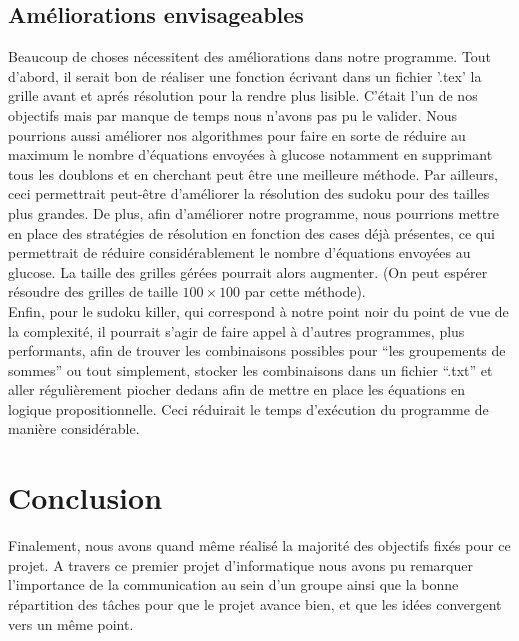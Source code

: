\documentclass[a4paper,8pt,french,fleqn]{article}
\begin{document}
\subsection{Améliorations envisageables}

Beaucoup de choses nécessitent des améliorations dans notre programme. Tout d'abord, il serait bon de réaliser une fonction écrivant dans un fichier '.tex' la grille avant et aprés résolution pour la rendre plus lisible. C'était l'un de nos objectifs mais par manque de temps nous n'avons pas pu le valider. Nous pourrions aussi améliorer nos algorithmes pour faire en sorte de réduire au maximum le nombre d'équations envoyées à glucose notamment en supprimant tous les doublons et en cherchant peut être une meilleure méthode. Par ailleurs, ceci permettrait peut-être d'améliorer la résolution des sudoku pour des tailles plus grandes. De plus, afin d'améliorer notre programme, nous pourrions mettre en place des stratégies de résolution en fonction des cases déjà présentes, ce qui permettrait de réduire considérablement le nombre d'équations envoyées au glucose. La taille des grilles gérées pourrait alors augmenter. (On peut espérer résoudre des grilles de taille $100 \times 100$ par cette méthode). \\

Enfin, pour le sudoku killer, qui correspond à notre point noir du point de vue de la complexité, il pourrait s'agir de faire appel à d'autres programmes, plus performants, afin de trouver les combinaisons possibles pour ``les groupements de sommes'' ou tout simplement, stocker les combinaisons dans un fichier ``.txt'' et aller régulièrement piocher dedans afin de mettre en place les équations en logique propositionnelle. Ceci réduirait le temps d'exécution du programme de manière considérable.

\section{Conclusion}

Finalement, nous avons quand même réalisé la majorité des objectifs fixés pour ce projet. A travers ce premier projet d'informatique nous avons pu remarquer l'importance de la communication au sein d'un groupe ainsi que la bonne répartition des tâches pour que le projet avance bien, et que les idées convergent vers un même point. 
\end{document}
